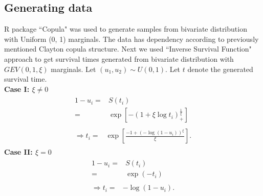 \documentclass[11pt]{article}
\theoremstyle{remboldstyle}
\begin{document}
\subsection{Generating data}
\noindent
R package ``Copula" was used to generate samples from bivariate distribution with Uniform (0, 1) marginals. The data has dependency according to previously mentioned Clayton copula structure. Next we used ``Inverse Survival Function" approach to get survival times generated from bivariate distribution with $GEV(0,1, \xi)$ marginals. Let $(u_1, u_2) \sim U(0, 1)$. Let $t$ denote the generated survival time. \\
\textbf{Case I: $\xi \neq 0$}
\begin{align}
\begin{split}
1 - u_i = {} &  S(t_i) \\
          = & \exp[-(1 + \xi \log t_i)_{+}^{\frac{1}{\xi}}]
\end{split}\\
\begin{split}
\Rightarrow t_i = {} & \exp[\frac{- 1 + (-\log(1 - u_i))^{\xi}}{\xi}].
\end{split}
\end{align}
\textbf{Case II: $\xi = 0$}
\begin{align}
\begin{split}
1 - u_i = {} &  S(t_i) \\
          = & \exp(-t_i)
\end{split}\\
\begin{split}
\Rightarrow t_i = {} & - \log(1 - u_i).
\end{split}
\end{align}
\end{document}

